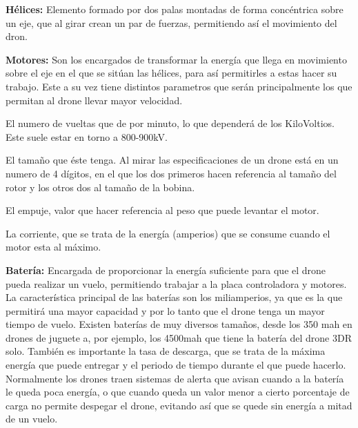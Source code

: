 \hspace{1 cm}\textbf{H\'elices:} Elemento formado por dos palas montadas de forma conc\'entrica sobre un eje, que al girar crean un par de fuerzas, permitiendo as\'i el movimiento del dron.

\hspace{1 cm}\textbf{Motores:} Son los encargados de transformar la energ\'ia que llega en movimiento sobre el eje en el que se sit\'uan las h\'elices, para as\'i permitirles a estas hacer su trabajo. Este a su vez tiene distintos parametros que ser\'an principalmente los que permitan al drone llevar mayor velocidad. 

\hspace{1 cm} El numero de vueltas que de por minuto, lo que depender\'a de los KiloVoltios. Este suele estar en torno a 800-900kV.

\hspace{1 cm} El tamaño que \'este tenga. Al mirar las especificaciones de un drone est\'a en un numero de 4 d\'igitos, en el que los dos primeros hacen referencia al tamaño del rotor y los otros dos al tamaño de la bobina. 

\hspace{1 cm} El empuje, valor que hacer referencia al peso que puede levantar el motor.

\hspace{1 cm} La corriente, que se trata de la energ\'ia (amperios) que se consume cuando el motor esta al m\'aximo.


\hspace{1 cm}\textbf{Bater\'ia:} Encargada de proporcionar la energ\'ia suficiente para que el drone pueda realizar un vuelo, permitiendo trabajar a la placa controladora y motores. La caracter\'istica principal de las bater\'ias son los miliamperios, ya que es la que permitir\'a una mayor capacidad y por lo tanto que el drone tenga un mayor tiempo de vuelo. Existen bater\'ias de muy diversos tamaños, desde los 350 mah en drones de juguete a, por ejemplo, los 4500mah que tiene la bater\'ia del drone 3DR solo. Tambi\'en es importante la tasa de descarga, que se trata de la m\'axima energ\'ia que puede entregar y el periodo de tiempo durante el que puede hacerlo. Normalmente los drones traen sistemas de alerta que avisan cuando a la bater\'ia le queda poca energ\'ia, o que cuando queda un valor menor a cierto porcentaje de carga no permite despegar el drone, evitando as\'i que se quede sin energ\'ia a mitad de un vuelo.

